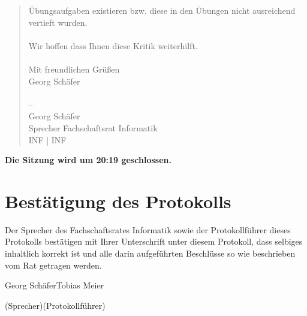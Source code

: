 \documentclass[a4paper, 11pt]{article} %
\newcommand{\TeXer}{Tobias Meier}
\newcommand{\fsiPresident}{Georg Schäfer}
\begin{document}
\begin{quote}
Übungsaufgaben existieren bzw. diese in den Übungen nicht ausreichend \\
vertieft wurden. \\
\\
Wir hoffen dass Ihnen diese Kritik weiterhilft. \\
\\
Mit freundlichen Grüßen \\
Georg Schäfer \\
\\
-- \\ 
Georg Schäfer \\
Sprecher Fachschaftsrat Informatik \\
INF | INF \\
\end{quote}
\textbf{Die Sitzung wird um 20:19 geschlossen.} \\

\pagebreak
\section{Bestätigung des Protokolls}
Der Sprecher des Fachschaftsrates Informatik sowie der Protokollführer dieses Protokolls bestätigen mit Ihrer Unterschrift unter diesem Protokoll, dass selbiges inhaltlich korrekt ist und alle darin aufgeführten Beschlüsse so wie beschrieben vom Rat getragen werden.
\\

\vspace{3.5cm}
\hrulefill \hfill \hrulefill

\fsiPresident \hfill \TeXer

{\footnotesize (Sprecher)\hfill (Protokollführer)}
\end{document}
